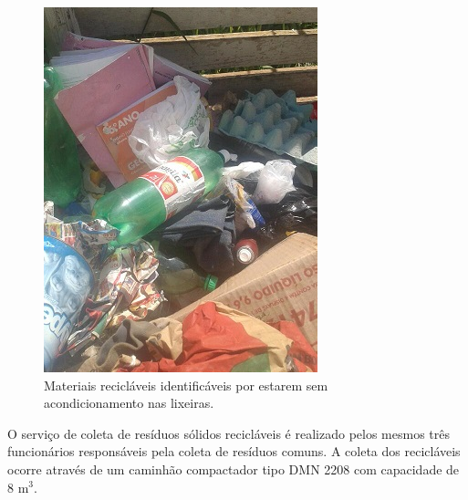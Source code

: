 	\begin{figure}
		\centering
		\includegraphics[width=0.75\linewidth]{produtos/prodtres/image043}
		\caption{Materiais recicláveis identificáveis por estarem sem acondicionamento nas lixeiras.}
		\label{fig:image043}
	\end{figure}
	
	
	O serviço de coleta de resíduos sólidos recicláveis é realizado pelos mesmos três funcionários responsáveis pela coleta de resíduos comuns. A coleta dos recicláveis ocorre através de um caminhão compactador tipo DMN 2208 com capacidade de 8 m$^{3}$.
		
